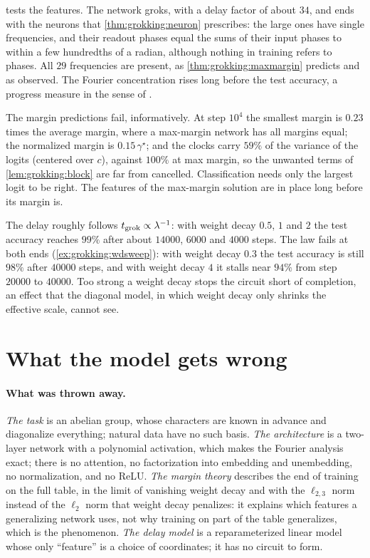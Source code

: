 \begin{refsection}
\begin{figure}[t]
\begin{fullwidth}
\end{fullwidth}
\end{figure}

 tests the features. The network groks, with a delay factor of about $34$, and ends with the neurons that \cref{thm:grokking:neuron} prescribes: the large ones have single frequencies, and their readout phases equal the sums of their input phases to within a few hundredths of a radian, although nothing in training refers to phases. All $29$ frequencies are present, as \cref{thm:grokking:maxmargin} predicts and as \textcite{MorwaniEtAl2024} observed. The Fourier concentration rises long before the test accuracy, a progress measure in the sense of \textcite{NandaEtAl2023}.

The margin predictions fail, informatively. At step $10^4$ the smallest margin is $0.23$ times the average margin, where a max-margin network has all margins equal; the normalized margin is $0.15\,\gamma^\star$; and the clocks carry $59\%$ of the variance of the logits (centered over $c$), against $100\%$ at max margin, so the unwanted terms of \cref{lem:grokking:block} are far from cancelled. Classification needs only the largest logit to be right. The features of the max-margin solution are in place long before its margin is.

The delay roughly follows $t_{\mathrm{grok}}\propto\lambda^{-1}$: with weight decay $0.5$, $1$ and $2$ the test accuracy reaches $99\%$ after about $14000$, $6000$ and $4000$ steps. The law fails at both ends (\cref{ex:grokking:wdsweep}): with weight decay $0.3$ the test accuracy is still $98\%$ after $40000$ steps, and with weight decay $4$ it stalls near $94\%$ from step $20000$ to $40000$. Too strong a weight decay stops the circuit short of completion, an effect that the diagonal model, in which weight decay only shrinks the effective scale, cannot see.

\section{What the model gets wrong}\label{sec:grokking:wrong}

\paragraph{What was thrown away.} \emph{The task} is an abelian group, whose characters are known in advance and diagonalize everything; natural data have no such basis. \emph{The architecture} is a two-layer network with a polynomial activation, which makes the Fourier analysis exact; there is no attention, no factorization into embedding and unembedding, no normalization, and no ReLU. \emph{The margin theory} describes the end of training on the full table, in the limit of vanishing weight decay and with the $\ell_{2,3}$ norm instead of the $\ell_2$ norm that weight decay penalizes: it explains which features a generalizing network uses, not why training on part of the table generalizes, which is the phenomenon. \emph{The delay model} is a reparameterized linear model whose only ``feature'' is a choice of coordinates; it has no circuit to form.


\end{refsection}
